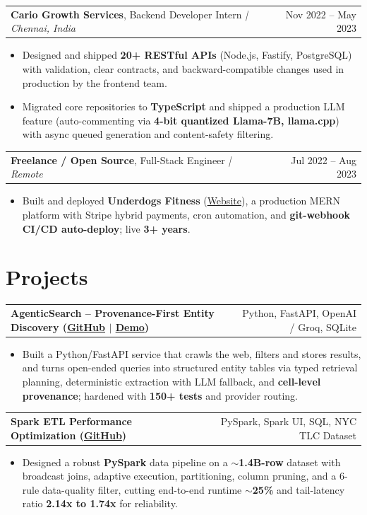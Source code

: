 \documentclass[letterpaper,11pt]{article}
\makeatletter
\newcommand{\expItem}[4]{%
  \vspace{3pt}
  \begin{tabular*}{\textwidth}{@{}l@{\extracolsep{\fill}}r@{}}
    \textbf{#1}, #2 \textit{| #3} & #4 \\
  \end{tabular*}\par\vspace{-2pt}
}
\newcommand{\projItem}[2]{%
  \vspace{6pt}
  \begin{tabular*}{\textwidth}{@{}l@{\extracolsep{\fill}}r@{}}
    \textbf{#1} & #2 \\
  \end{tabular*}\par\vspace{-2pt}
}
\makeatother
\begin{document}
\expItem{Cario Growth Services}{Backend Developer Intern}{Chennai, India}{Nov 2022 -- May 2023}
\begin{itemize}
  \item Designed and shipped \textbf{20+ RESTful APIs} (Node.js, Fastify, PostgreSQL) with validation, clear contracts, and backward-compatible changes used in production by the frontend team.
  \item Migrated core repositories to \textbf{TypeScript} and shipped a production LLM feature (auto-commenting via \textbf{4-bit quantized Llama-7B, llama.cpp}) with async queued generation and content-safety filtering.
\end{itemize}

\expItem{Freelance / Open Source}{Full-Stack Engineer}{Remote}{Jul 2022 -- Aug 2023}
\begin{itemize}
  \item Built and deployed \textbf{Underdogs Fitness} (\href{https://www.underdogsfitness.in/}{Website}), a production MERN platform with Stripe hybrid payments, cron automation, and \textbf{git-webhook CI/CD auto-deploy}; live \textbf{3+ years}.
\end{itemize}

\section{Projects}

\projItem{AgenticSearch -- Provenance-First Entity Discovery {\normalfont\small(\href{https://github.com/Deva-1903/ciir_agentic_search}{GitHub} $\vert$ \href{https://agentic-search-negglszkwa-uc.a.run.app}{Demo})}}{Python, FastAPI, OpenAI / Groq, SQLite}
\begin{itemize}
  \item Built a Python/FastAPI service that crawls the web, filters and stores results, and turns open-ended queries into structured entity tables via typed retrieval planning, deterministic extraction with LLM fallback, and \textbf{cell-level provenance}; hardened with \textbf{150+ tests} and provider routing.
\end{itemize}

\projItem{Spark ETL Performance Optimization {\normalfont\small(\href{https://github.com/Deva-1903/Spark-ETL-Optimization}{GitHub})}}{PySpark, Spark UI, SQL, NYC TLC Dataset}
\begin{itemize}
  \item Designed a robust \textbf{PySpark} data pipeline on a \textbf{$\sim$1.4B-row} dataset with broadcast joins, adaptive execution, partitioning, column pruning, and a 6-rule data-quality filter, cutting end-to-end runtime \textbf{$\sim$25\%} and tail-latency ratio \textbf{2.14x to 1.74x} for reliability.
\end{itemize}
\end{document}
